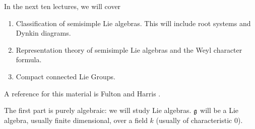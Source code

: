  \setcounter{lecture}{11}
  

 In the next ten lectures, we will cover
 \begin{enumerate}
 \item Classification of semisimple Lie algebras. This will include root systems and
       Dynkin diagrams.

 \item Representation theory of semisimple Lie algebras and the Weyl character formula.

 \item Compact connected Lie Groups.
 \end{enumerate}
 A reference for this material is Fulton and Harris \cite{FulHar}.

 The first part is purely algebraic: we will study Lie algebras. $\mathfrak{g}$ will be a Lie
 algebra, usually finite dimensional, over a field $k$ (usually of characteristic 0).

